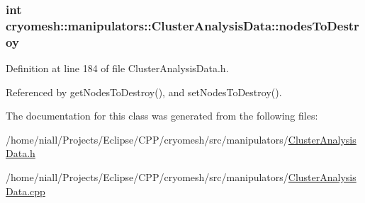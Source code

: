 \hypertarget{classcryomesh_1_1manipulators_1_1ClusterAnalysisData_afcdd6cf5b2a890ed24cce7ddf6855bd8}{
\subsubsection[{nodes\-To\-Destroy}]{\setlength{\rightskip}{0pt plus 5cm}int {\bf cryomesh\-::manipulators\-::\-Cluster\-Analysis\-Data\-::nodes\-To\-Destroy}}}\label{classcryomesh_1_1manipulators_1_1ClusterAnalysisData_afcdd6cf5b2a890ed24cce7ddf6855bd8}


\-Definition at line 184 of file \-Cluster\-Analysis\-Data.\-h.



\-Referenced by get\-Nodes\-To\-Destroy(), and set\-Nodes\-To\-Destroy().



\-The documentation for this class was generated from the following files\-:\begin{DoxyCompactItemize}
\item 
/home/niall/\-Projects/\-Eclipse/\-C\-P\-P/cryomesh/src/manipulators/\hyperlink{ClusterAnalysisData_8h}{\-Cluster\-Analysis\-Data.\-h}\item 
/home/niall/\-Projects/\-Eclipse/\-C\-P\-P/cryomesh/src/manipulators/\hyperlink{ClusterAnalysisData_8cpp}{\-Cluster\-Analysis\-Data.\-cpp}\end{DoxyCompactItemize}
